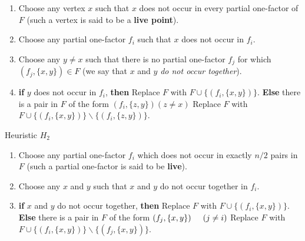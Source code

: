 \documentclass[
  11pt,
  a4paper]{book}
\begin{document}
\begin{enumerate}
\def\labelenumi{\arabic{enumi}.}
\item
  Choose any vertex \(x\) such that \(x\) does not occur in
  every partial one-factor of \(F\) (such a vertex is said
  to be a \textbf{live point}).
\item
  Choose any partial one-factor \(f_i\) such that \(x\) does
  not occur in \(f_i\).
\item
  Choose any \(y \neq x\) such that there is no partial
  one-factor \(f_j\) for which \((f_j,\{x,y\}) \in F\)
  (we say that \(x\) and \(y\) \emph{do not occur together}).
\item
  \textbf{if} \(y\) does not occur in \(f_i\), \textbf{then}
  Replace \(F\) with \(F \cup \{(f_i,\{x,y\})\}\).
  \textbf{Else} there is a pair in \(F\) of the form
  \((f_i,\{z,y\}) (z \neq x)\)
  Replace \(F\) with
  \(F \cup \{(f_i,\{x,y\})\} \backslash \{(f_i,\{z,y\})\}\).
\end{enumerate}

Heuristic \(H_2\)

\begin{enumerate}
\def\labelenumi{\arabic{enumi}.}
\item
  Choose any partial one-factor \(f_i\) which does not
  occur in exactly \(n/2\) pairs in \(F\) (such a partial
  one-factor is said to be \textbf{live}).
\item
  Choose any \(x\) and \(y\) such that \(x\) and \(y\) do not
  occur together in \(f_i\).
\item
  \textbf{if} \(x\) and \(y\) do not occur together, \textbf{then}
  Replace \(F\) with \(F \cup \{(f_i,\{x,y\})\}\).
  \textbf{Else} there is a pair in \(F\) of the form
  \((f_j,\{x,y\}) \hspace{0.5cm} (j \neq i)\)
  Replace \(F\) with
  \(F \cup \{(f_i,\{x,y\})\} \backslash \{(f_j,\{x,y\})\}\).
\end{enumerate}
\end{document}
